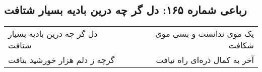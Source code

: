 \begin{center}
\section*{رباعی شماره ۱۶۵: دل گر چه درین بادیه بسیار شتافت}
\label{sec:sh165}
\begin{longtable}{l p{0.5cm} r}
دل گر چه درین بادیه بسیار شتافت
&&
یک موی ندانست و بسی موی شکافت
\\
گرچه ز دلم هزار خورشید بتافت
&&
آخر به کمال ذره‌ای راه نیافت
\\
\end{longtable}
\end{center}
